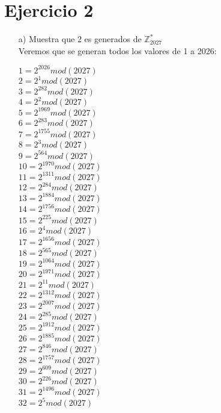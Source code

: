\documentclass[12pt, letterpaper]{article}
\begin{document}
\section*{Ejercicio 2}
\begin{itemize}
\item[a)] Muestra que 2 es generados de $\mathbb{Z}^*_{2027}$\\
Veremos que se generan todos los valores de 1 a 2026:
\begin{multicols}{3}
$1= 2^{2026} mod (2027)$\\
$2= 2^{1} mod (2027)$\\
$3= 2^{282} mod (2027)$\\
$4= 2^{2} mod (2027)$\\
$5= 2^{1969} mod (2027)$\\
$6= 2^{283} mod (2027)$\\
$7= 2^{1755} mod (2027)$\\
$8= 2^{3} mod (2027)$\\
$9= 2^{564} mod (2027)$\\
$10= 2^{1970} mod (2027)$\\
$11= 2^{1311} mod (2027)$\\
$12= 2^{284} mod (2027)$\\
$13= 2^{1884} mod (2027)$\\
$14= 2^{1756} mod (2027)$\\
$15= 2^{225} mod (2027)$\\
$16= 2^{4} mod (2027)$\\
$17= 2^{1656} mod (2027)$\\
$18= 2^{565} mod (2027)$\\
$19= 2^{1064} mod (2027)$\\
$20= 2^{1971} mod (2027)$\\
$21= 2^{11} mod (2027)$\\
$22= 2^{1312} mod (2027)$\\
$23= 2^{2007} mod (2027)$\\
$24= 2^{285} mod (2027)$\\
$25= 2^{1912} mod (2027)$\\
$26= 2^{1885} mod (2027)$\\
$27= 2^{846} mod (2027)$\\
$28= 2^{1757} mod (2027)$\\
$29= 2^{609} mod (2027)$\\
$30= 2^{226} mod (2027)$\\
$31= 2^{1496} mod (2027)$\\
$32= 2^{5} mod (2027)$\\

\end{multicols}
\end{itemize}
\end{document}
